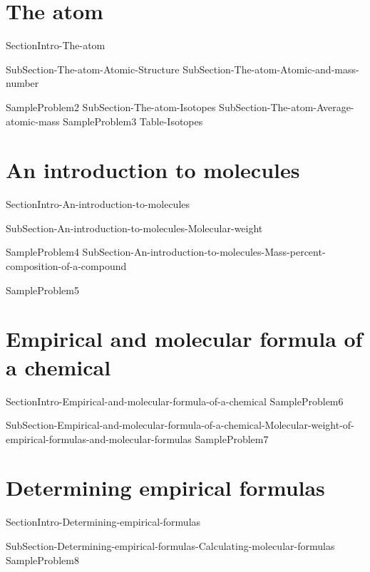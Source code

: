 \documentclass[main.tex]{subfiles}
\begin{document}
\section{The atom}
{SectionIntro-The-atom}
   
\sloppy
\begin{description}
{SubSection-The-atom-Atomic-Structure}
{SubSection-The-atom-Atomic-and-mass-number}
 
 
{SampleProblem2}
{SubSection-The-atom-Isotopes}
{SubSection-The-atom-Average-atomic-mass}
{SampleProblem3}
 {Table-Isotopes}
\end{description}
\section{An introduction to molecules}
{SectionIntro-An-introduction-to-molecules}
\sloppy
\begin{description}
{SubSection-An-introduction-to-molecules-Molecular-weight}
 
{SampleProblem4}
{SubSection-An-introduction-to-molecules-Mass-percent-composition-of-a-compound}
 
{SampleProblem5}
\end{description}
\section{Empirical and molecular formula of a chemical}
{SectionIntro-Empirical-and-molecular-formula-of-a-chemical}
{SampleProblem6}
\sloppy
\begin{description}
{SubSection-Empirical-and-molecular-formula-of-a-chemical-Molecular-weight-of-empirical-formulas-and-molecular-formulas}
{SampleProblem7}
\end{description}
\section{Determining empirical formulas}
{SectionIntro-Determining-empirical-formulas}
\sloppy
\begin{description}
{SubSection-Determining-empirical-formulas-Calculating-molecular-formulas}
{SampleProblem8}
\end{description}
\end{document}
